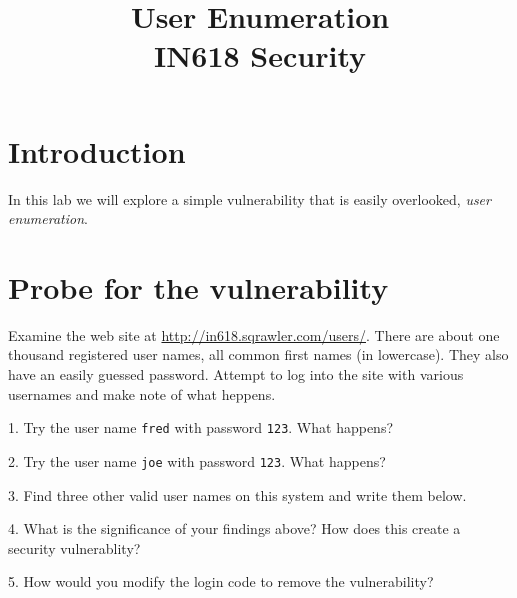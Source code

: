 \documentclass{article}
\begin{document}
\title{User Enumeration\\ IN618 Security}
\date{}
\maketitle

\section*{Introduction}
In this lab we will explore a simple vulnerability that is easily overlooked, \emph{user enumeration}.

\section{Probe for the vulnerability}
Examine the web site at \url{http://in618.sqrawler.com/users/}.  There are 
about one thousand registered user names, all common first names (in lowercase).  
They also have an easily guessed password.  Attempt to log into the site with 
various usernames and make note of what heppens.

1.  Try the user name \texttt{fred} with password \texttt{123}. What
happens?

\vspace{15mm}

2. Try the user name \texttt{joe} with password \texttt{123}.  What happens?

\vspace{15mm}

3.  Find three other valid user names on this system and write them below.

\vspace{30mm}

4.  What is the significance of your findings above?  How does this create a 
security vulnerablity?

\newpage     

5.  How would you modify the login code to remove the vulnerability?
\end{document}
